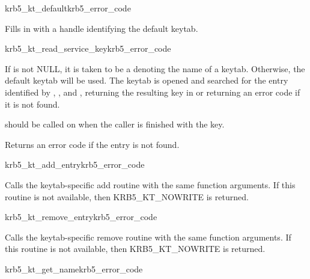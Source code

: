 \begin{funcdecl}{krb5_kt_default}{krb5_error_code}{\funcinout}
\funcin
{}
\end{funcdecl}

Fills in  with a handle identifying the default keytab.

\begin{funcdecl}{krb5_kt_read_service_key}{krb5_error_code}{\funcinout}
\funcin
{}
\funcout
{}
\end{funcdecl}

If  is not NULL, it is taken to be a
 denoting the name of a keytab.  Otherwise, the default
keytab will be used.
The keytab is opened and searched for the entry identified by
, , and , 
returning the resulting key
in  or returning an error code if it is not found. 

 should be called on  when
the caller is finished with the key.

Returns an error code if the entry is not found.

\begin{funcdecl}{krb5_kt_add_entry}{krb5_error_code}{\funcinout}
\funcin
{}
\end{funcdecl}

Calls the keytab-specific add routine 
with the same function arguments.  If this routine is not available,
then KRB5_KT_NOWRITE is returned.

\begin{funcdecl}{krb5_kt_remove_entry}{krb5_error_code}{\funcinout}
\funcin
{}
\end{funcdecl}

Calls the keytab-specific remove routine
 with the same function arguments.
If this routine is not available, then KRB5_KT_NOWRITE is returned.

\begin{funcdecl}{krb5_kt_get_name}{krb5_error_code}{\funcinout}
\funcout
{}
\funcin
{}
\end{funcdecl}

